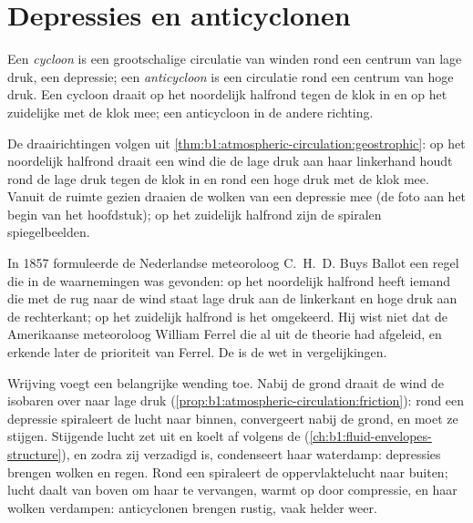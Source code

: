 \section{Depressies en anticyclonen}\label{sec:b1:atmospheric-circulation:cyclones}

\begin{definition}\label{def:b1:atmospheric-circulation:cyclone}
Een \emph{cycloon} is een grootschalige circulatie van winden rond een centrum van lage druk, een depressie; een \emph{anticycloon} is een circulatie rond een centrum van hoge druk. Een cycloon draait op het noordelijk halfrond tegen de klok in en op het zuidelijke met de klok mee; een anticycloon in de andere richting.
\end{definition}

De draairichtingen volgen uit \cref{thm:b1:atmospheric-circulation:geostrophic}: op het noordelijk halfrond draait een wind die de lage druk aan haar linkerhand houdt rond de lage druk tegen de klok in en rond een hoge druk met de klok mee. Vanuit de ruimte gezien draaien de wolken van een depressie mee (de foto aan het begin van het hoofdstuk); op het zuidelijk halfrond zijn de spiralen spiegelbeelden.

\begin{history}
In 1857 formuleerde de Nederlandse meteoroloog C.~H.~D. Buys Ballot een regel die in de waarnemingen was gevonden: op het noordelijk halfrond heeft iemand die met de rug naar de wind staat lage druk aan de linkerkant en hoge druk aan de rechterkant; op het zuidelijk halfrond is het omgekeerd. Hij wist niet dat de Amerikaanse meteoroloog William Ferrel die al uit de theorie had afgeleid, en erkende later de prioriteit van Ferrel. De  is de wet in vergelijkingen.
\end{history}

Wrijving voegt een belangrijke wending toe. Nabij de grond draait de wind de isobaren over naar lage druk (\cref{prop:b1:atmospheric-circulation:friction}): rond een depressie spiraleert de lucht naar binnen, convergeert nabij de grond, en moet ze stijgen. Stijgende lucht zet uit en koelt af volgens de  (\cref{ch:b1:fluid-envelopes-structure}), en zodra zij verzadigd is, condenseert haar waterdamp: depressies brengen wolken en regen. Rond een  spiraleert de oppervlaktelucht naar buiten; lucht daalt van boven om haar te vervangen, warmt op door compressie, en haar wolken verdampen: anticyclonen brengen rustig, vaak helder weer.

